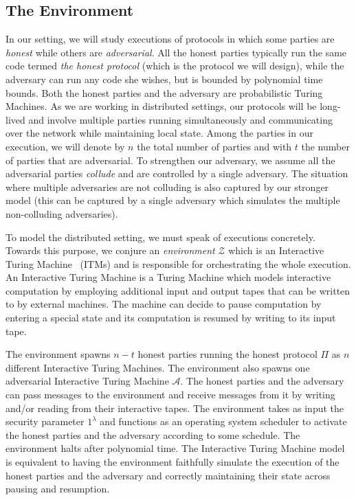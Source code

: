 \subsection{The Environment}

In our setting, we will study executions of protocols in which some parties
are \emph{honest} while others are \emph{adversarial}. All the honest parties
typically run the same code termed \emph{the honest protocol} (which is the
protocol we will design), while the adversary can run any code she wishes, but
is bounded by polynomial time bounds. Both the honest parties and the adversary
are probabilistic Turing Machines. As we are working in distributed settings,
our protocols will be long-lived and involve multiple parties running
simultaneously and communicating over the network while maintaining local state.
Among the parties in our execution, we will denote by $n$ the total number of
parties and with $t$ the number of parties that are adversarial. To strengthen
our adversary, we assume all the adversarial parties \emph{collude} and are
controlled by a single adversary. The situation where multiple adversaries are
not colluding is also captured by our stronger model (this can be captured by a
single adversary which simulates the multiple non-colluding adversaries).

To model the distributed setting, we must speak of executions concretely.
Towards this purpose, we conjure an \emph{environment} $\mathcal{Z}$
 which is an
Interactive Turing Machine~\cite{interactive-tm} (ITMs)  and is responsible for
orchestrating the whole execution. An Interactive Turing Machine is a Turing
Machine which models interactive computation by employing additional input and
output tapes that can be written to by external machines. The machine can decide
to pause computation by entering a special state and its computation is resumed
by writing to its input tape.

The environment spawns $n - t$ honest parties running the honest protocol $\Pi$ as
$n$ different Interactive Turing Machines. The environment also spawns one
adversarial Interactive Turing Machine $\mathcal{A}$. The honest parties and the
adversary can pass messages to the environment and receive messages from it by
writing and/or reading from their interactive tapes. The environment takes as
input the security parameter $1^\lambda$ and functions as an operating system
scheduler to activate the honest parties and the adversary according to some
schedule. The environment halts after polynomial time. The Interactive Turing
Machine model is equivalent to having the environment faithfully simulate the
execution of the honest parties and the adversary and correctly maintaining
their state across pausing and resumption.

